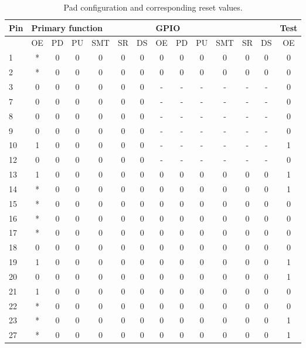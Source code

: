 \begin{table}[htbp]
 \caption{Pad configuration and corresponding reset values.}
 \label{tab:pads}
\begin{tabularx}{\textwidth}{|X|c|c|c|c|c|c||c|c|c|c|c|c||c|}
  \hline
  \textbf{Pin} & \multicolumn{6}{l||}{\textbf{Primary function}}&  \multicolumn{6}{l||}{\textbf{GPIO}}& \textbf{Test}\\ \hline
    & OE & PD & PU & SMT & SR & DS & OE & PD & PU & SMT & SR & DS & OE \\ \hline
   1  & * & 0 & 0 & 0 & 0 & 0 & 0 & 0 & 0 & 0 & 0 & 0 & 0 \\ \hline
   2  & * & 0 & 0 & 0 & 0 & 0 & 0 & 0 & 0 & 0 & 0 & 0 & 0 \\ \hline
   3  & 0 & 0 & 0 & 0 & 0 & 0 & - & - & - & - & - & - & 0 \\ \hline
   7  & 0 & 0 & 0 & 0 & 0 & 0 & - & - & - & - & - & - & 0 \\ \hline
   8  & 0 & 0 & 0 & 0 & 0 & 0 & - & - & - & - & - & - & 0 \\ \hline
   9  & 0 & 0 & 0 & 0 & 0 & 0 & - & - & - & - & - & - & 0 \\ \hline
   10 & 1 & 0 & 0 & 0 & 0 & 0 & - & - & - & - & - & - & 1 \\ \hline
   12 & 0 & 0 & 0 & 0 & 0 & 0 & - & - & - & - & - & - & 0 \\ \hline
   13 & 1 & 0 & 0 & 0 & 0 & 0 & 0 & 0 & 0 & 0 & 0 & 0 & 1 \\ \hline
   14 & * & 0 & 0 & 0 & 0 & 0 & 0 & 0 & 0 & 0 & 0 & 0 & 1 \\ \hline
   15 & * & 0 & 0 & 0 & 0 & 0 & 0 & 0 & 0 & 0 & 0 & 0 & 0 \\ \hline
   16 & * & 0 & 0 & 0 & 0 & 0 & 0 & 0 & 0 & 0 & 0 & 0 & 0 \\ \hline
   17 & * & 0 & 0 & 0 & 0 & 0 & 0 & 0 & 0 & 0 & 0 & 0 & 0 \\ \hline
   18 & 0 & 0 & 0 & 0 & 0 & 0 & 0 & 0 & 0 & 0 & 0 & 0 & 0 \\ \hline
   19 & 1 & 0 & 0 & 0 & 0 & 0 & 0 & 0 & 0 & 0 & 0 & 0 & 1 \\ \hline
   20 & 0 & 0 & 0 & 0 & 0 & 0 & 0 & 0 & 0 & 0 & 0 & 0 & 1 \\ \hline
   21 & 1 & 0 & 0 & 0 & 0 & 0 & 0 & 0 & 0 & 0 & 0 & 0 & 0 \\ \hline
   22 & * & 0 & 0 & 0 & 0 & 0 & 0 & 0 & 0 & 0 & 0 & 0 & 0 \\ \hline
   23 & * & 0 & 0 & 0 & 0 & 0 & 0 & 0 & 0 & 0 & 0 & 0 & 1 \\ \hline
   27 & * & 0 & 0 & 0 & 0 & 0 & 0 & 0 & 0 & 0 & 0 & 0 & 1 \\ \hline

\end{tabularx}
\end{table}
